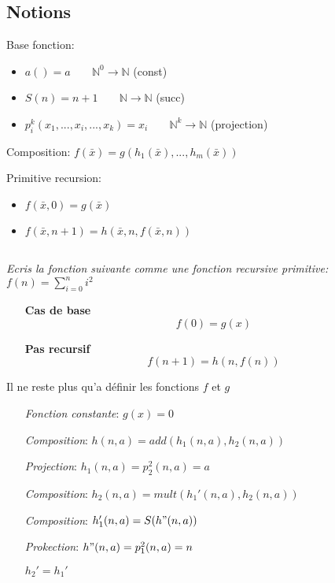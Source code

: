 
\subsection*{Notions}

Base fonction:
\begin{itemize}
	\item $a() = a \;\;\;\;\;\;\; \mathbb{N}^0 \rightarrow \mathbb{N}$ (const)
	\item $S(n) = n+1 \;\;\;\;\;\;\; \mathbb{N} \rightarrow \mathbb{N}$ (succ)
	\item $p_i^k(x_1, ..., x_i, ..., x_k) = x_i \;\;\;\;\;\;\; \mathbb{N}^k \rightarrow \mathbb{N}$ (projection)
\end{itemize}

Composition: $f(\bar{x}) = g(h_1(\bar{x}), ..., h_m(\bar{x}))$

Primitive recursion:
\begin{itemize}
	\item $f(\bar{x}, 0) = g(\bar{x})$
	\item $f(\bar{x}, n+1) = h(\bar{x}, n, f(\bar{x}, n))$
\end{itemize}

\subsection{}
\textit{Ecris la fonction suivante comme une fonction recursive primitive: $f(n) = \sum_{i=0}^{n}i^2$}

\begin{itemize}
	\item[\textbf{Cas de base}] $$f(0) = g(x)$$
	\item[\textbf{Pas recursif}] $$f(n+1) = h(n,f(n))$$
\end{itemize}

Il ne reste plus qu'a définir les fonctions $f$ et $g$

\begin{itemize}
	\item[] \textit{Fonction constante}: $g(x) = 0$
	\item[] \textit{Composition}: $h(n,a) = add(h_1(n,a),h_2(n,a))$
	\item[] \textit{Projection}: $h_1(n,a) = p_2^2(n,a)=a$
	\item[] \textit{Composition}: $h_2(n,a) = mult(h_1'(n,a), h_2(n,a))$
	\item[] \textit{Composition}: $h_1'(n,a) = S(h"(n,a))$
	\item[] \textit{Prokection}: $h"(n,a)=p_1^2(n,a) = n$
	\item[] $h_2' = h_1'$
\end{itemize}

